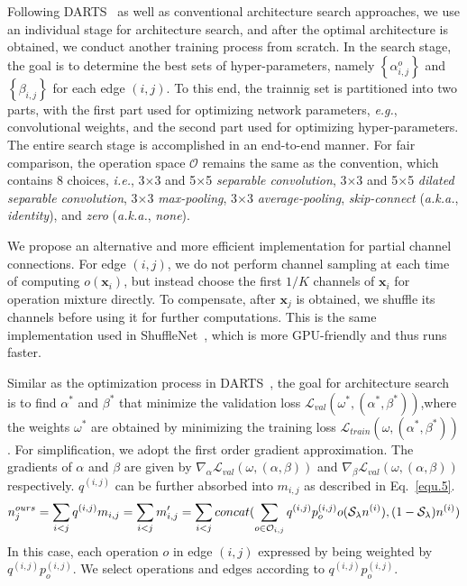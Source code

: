 \documentclass{article} \usepackage{iclr2020_conference,times}
\begin{document}
Following DARTS~\citep{liu2018darts} as well as conventional architecture search approaches, we use an individual stage for architecture search, and after the optimal architecture is obtained, we conduct another training process from scratch. In the search stage, the goal is to determine the best sets of hyper-parameters, namely $\left\{\alpha_{i,j}^o\right\}$ and $\left\{\beta_{i,j}\right\}$ for each edge $\left(i,j\right)$. To this end, the trainnig set is partitioned into two parts, with the first part used for optimizing network parameters, \textit{e.g.}, convolutional weights, and the second part used for optimizing hyper-parameters. The entire search stage is accomplished in an end-to-end manner. For fair comparison, the operation space $\mathcal{O}$ remains the same as the convention, which contains $8$ choices, \textit{i.e.}, 3$\times$3 and 5$\times$5 \textit{separable convolution}, 3$\times$3 and 5$\times$5 \textit{dilated separable convolution}, 3$\times$3 \textit{max-pooling}, 3$\times$3 \textit{average-pooling}, \textit{skip-connect} (\textit{a.k.a.}, \textit{identity}), and \textit{zero} (\textit{a.k.a.}, \textit{none}).

We propose an alternative and more efficient implementation for partial channel connections. For edge $\left(i,j\right)$, we do not perform channel sampling at each time of computing $o\!\left(\mathbf{x}_i\right)$, but instead choose the first $1/K$ channels of $\mathbf{x}_i$ for operation mixture directly. To compensate, after $\mathbf{x}_j$ is obtained, we shuffle its channels before using it for further computations. This is the same implementation used in ShuffleNet~\citep{zhang2018shufflenet}, which is more GPU-friendly and thus runs faster.

\iffalse
Similar as the optimization process in DARTS~\citep{liu2018darts}, the goal for architecture search is to find $\alpha^*$ and $\beta^*$ that minimize the validation loss $\mathcal{L}_{val}(\omega^*,(\alpha^*,\beta^*))$,where the weights $\omega^*$ are obtained by minimizing the training loss $\mathcal{L}_{train}(\omega,(\alpha^*,\beta^*))$. For simplification, we adopt the first order gradient approximation. The gradients of $\alpha$ and $\beta$ are given by $\nabla_\alpha \mathcal{L}_{val}(\omega,(\alpha,\beta))$ and $\nabla_\beta \mathcal{L}_{val}(\omega,(\alpha,\beta))$ respectively. $q^{(i,j)}$ can be further absorbed into $m_{i,j}$ as described in Eq.~\ref{equ.5}.
\begin{equation}\label{equ.5}
n_j^{ours}=\sum_{i<j}q^{(i,j)}m_{i,j}=\sum_{i<j}m'_{i,j}\\
=\sum_{i<j}concat(\sum_{o\in \mathcal{O}_{i,j}} q^{(i,j)}p^{(i,j)}_oo(\mathcal{S}_{\lambda} n^{(i)}), (1-\mathcal{S}_{\lambda})n^{(i)})\\
\end{equation}
In this case, each operation $o$ in edge $(i,j)$ expressed by being weighted by $q^{(i,j)}p^{(i,j)}_o$. We select operations and edges according to $q^{(i,j)}p^{(i,j)}_o$.
\end{document}
